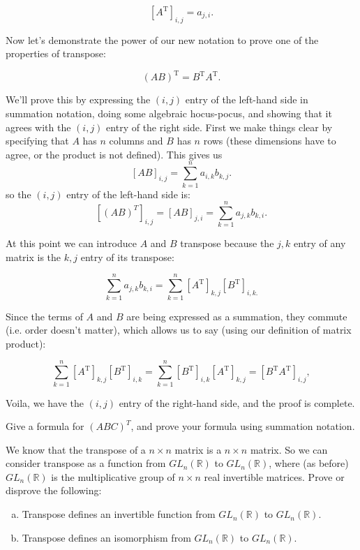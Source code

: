 \[ \left[ {A}^{\text{T}} \right]_{i,j} = {a}_{j,i}. \]

Now let's demonstrate the power of our new notation to prove one of the properties of transpose:

\[ \left( {A}{B} \right)^{\text{T}} = {B}^{\text{T}} {A}^{\text{T}}. \]

We'll prove this by expressing the $(i,j)$ entry of the left-hand side in summation notation,  doing some algebraic hocus-pocus, and showing that it agrees with the $(i,j)$ entry of the right side.  First we make things clear by specifying that ${A}$ has $n$ columns and $B$ has $n$ rows (these dimensions have to agree, or the product is not defined). This gives us
\[ \left[ AB \right]_{i,j}= \sum_{k=1}^n a_{i,k} b_{k,j}. \]
so the $(i,j)$ entry of the left-hand side is:
 \[ \left[ (AB)^T \right]_{i,j} = \left[ AB \right]_{j,i} = \sum_{k=1}^n a_{j,k} b_{k,i}. \]

At this point we can introduce ${A}$ and ${B}$ transpose  because the $j,k$ entry of any matrix is the $k,j$ entry of its transpose:

\[  \sum_{k=1}^n a_{j,k} b_{k,i} =  \sum_{k=1}^n \left[A^{\text{T}}\right]_{k,j} \left[B^{\text{T}}\right]_{i,k.} \]

Since the terms of ${A}$ and ${B}$ are being expressed as a summation, they commute (i.e. order doesn't matter), which allows us to say (using our definition of matrix product):

\[ \sum_{k=1}^n \left[A^{\text{T}}\right]_{k,j} \left[B^{\text{T}}\right]_{i,k} = \sum_{k=1}^n \left[B^{\text{T}}\right]_{i,k}\left[A^{\text{T}}\right]_{k,j} = \left[ {B}^{\text{T}}{A}^{\text{T}} \right]_{i,j}, \]

Voila, we have the $(i,j)$ entry of the right-hand side, and the proof is complete.



\begin{exercise}
Give a formula for $(ABC)^T$, and prove your formula using summation notation.
\end{exercise}

\begin{exercise}
We know that the transpose of a $n \times n$ matrix is a $n \times n$ matrix.  So we can consider transpose as a function from $GL_n(\mathbb{R})$ to $GL_n(\mathbb{R})$, where (as before)  $GL_n(\mathbb{R})$  is the multiplicative group of $n \times n$ real invertible matrices. Prove or disprove the following:
\begin{enumerate}[(a)]
\item
Transpose defines an invertible function from $GL_n(\mathbb{R})$ to $GL_n(\mathbb{R})$.
\item
Transpose defines an isomorphism from $GL_n(\mathbb{R})$ to $GL_n(\mathbb{R})$.
\end{enumerate}
\end{exercise}

